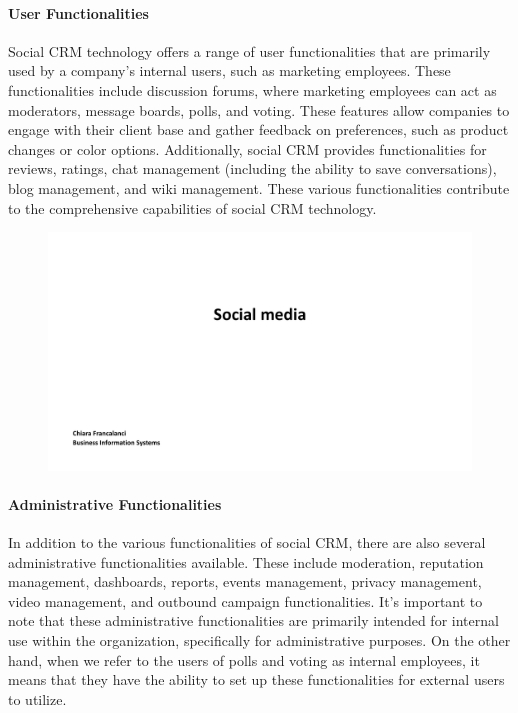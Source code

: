 \paragraph{User Functionalities}\label{user-functionalities}
Social CRM technology offers a range of user functionalities that are
primarily used by a company's internal users, such as marketing
employees. These functionalities include discussion forums, where
marketing employees can act as moderators, message boards, polls, and
voting. These features allow companies to engage with their client base
and gather feedback on preferences, such as product changes or color
options. Additionally, social CRM provides functionalities for reviews,
ratings, chat management (including the ability to save conversations),
blog management, and wiki management. These various functionalities
contribute to the comprehensive capabilities of social CRM technology.

\begin{figure}[!h]
    \centering
    \includegraphics[page=26, trim = 0cm 5.5cm 5cm 0.5cm, clip, width=\textwidth]{images/04 - Social_Media.pdf}
\end{figure}

\paragraph{Administrative
    Functionalities}\label{administrative-functionalities}
In addition to the various functionalities of social CRM, there are also
several administrative functionalities available. These include
moderation, reputation management, dashboards, reports, events
management, privacy management, video management, and outbound campaign
functionalities. It's important to note that these administrative
functionalities are primarily intended for internal use within the
organization, specifically for administrative purposes. On the other
hand, when we refer to the users of polls and voting as internal
employees, it means that they have the ability to set up these
functionalities for external users to utilize.


